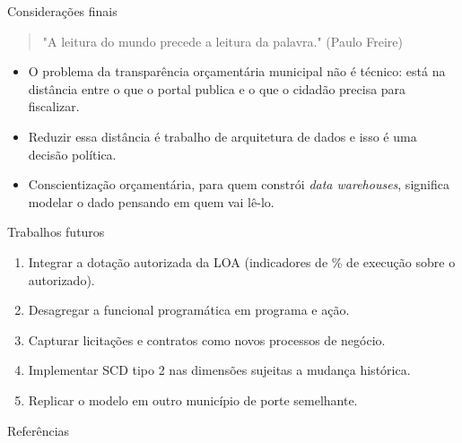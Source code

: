 \documentclass[aspectratio=169]{beamer}
\begin{document}
\begin{frame}{Considerações finais}
  \begin{quote}
    "A leitura do mundo precede a leitura da palavra." (Paulo Freire)
  \end{quote}
  \vspace{0.2cm}
  \begin{itemize}
    \item O problema da transparência orçamentária municipal não é técnico: está na distância entre o que o portal publica e o que o cidadão precisa para fiscalizar.
    \item Reduzir essa distância é trabalho de arquitetura de dados e isso é uma decisão política.
    \item Conscientização orçamentária, para quem constrói \textit{data warehouses}, significa modelar o dado pensando em quem vai lê-lo.
  \end{itemize}
\end{frame}

\begin{frame}{Trabalhos futuros}
  \begin{enumerate}\small
    \item Integrar a dotação autorizada da LOA (indicadores de \% de execução sobre o autorizado).
    \item Desagregar a funcional programática em programa e ação.
    \item Capturar licitações e contratos como novos processos de negócio.
    \item Implementar SCD tipo 2 nas dimensões sujeitas a mudança histórica.
    \item Replicar o modelo em outro município de porte semelhante.
  \end{enumerate}
  \vspace{0.2cm}
\end{frame}

\appendix

\begin{frame}[allowframebreaks]{Referências}
  
\end{frame}

{
\begin{frame}
\end{frame}
}
\end{document}
